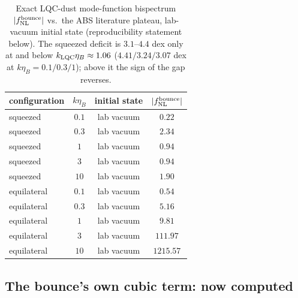 \documentclass[aps,prd,twocolumn,superscriptaddress,nofootinbib,longbibliography]{revtex4-2}
\newcommand{\fnl}{f_{\rm NL}}
\begin{document}
\begin{table}[h]
\caption{\label{tab:lane9c2}Exact LQC-dust mode-function bispectrum
$|\fnl^{\rm bounce}|$ vs.\ the ABS literature plateau, lab-vacuum initial
state (reproducibility statement below). The squeezed
deficit is $3.1$--$4.4$ dex only at and below $k_{\rm LQC}\eta_B\approx1.06$
($4.41/3.24/3.07$ dex at $k\eta_B=0.1/0.3/1$);
above it the sign of the gap reverses.}
\begin{tabular}{lccc}
\hline\hline
configuration & $k\eta_B$ & initial state & $|\fnl^{\rm bounce}|$ \\
\hline
squeezed & $0.1$ & lab vacuum & $0.22$ \\
squeezed & $0.3$ & lab vacuum & $2.34$ \\
squeezed & $1$ & lab vacuum & $0.94$ \\
squeezed & $3$ & lab vacuum & $0.94$ \\
squeezed & $10$ & lab vacuum & $1.90$ \\
equilateral & $0.1$ & lab vacuum & $0.54$ \\
equilateral & $0.3$ & lab vacuum & $5.16$ \\
equilateral & $1$ & lab vacuum & $9.81$ \\
equilateral & $3$ & lab vacuum & $111.97$ \\
equilateral & $10$ & lab vacuum & $1215.57$ \\
\hline\hline
\end{tabular}
\end{table}

\subsection{The bounce's own cubic term: now computed}
\label{sec:bounce_cubic}
\end{document}
